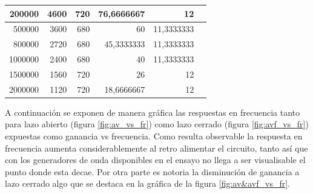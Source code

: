 \documentclass[12pt, letterpaper]{article}
\begin{document}
\begin{table}[H]
\begin{tabular}{|r|r|r|r|r|r}
    \cmidrule   200000 & 4600  & 720   & 76,6666667 & 12    &  \\
    
    \cmidrule   500000 & 3600  & 680   & 60    & 11,3333333 &  \\
    
    \cmidrule    800000 & 2720  & 680   & 45,3333333 & 11,3333333 &  \\
    
    \cmidrule    1000000 & 2400  & 680   & 40    & 11,3333333 &  \\
    \cmidrule   1500000 & 1560  & 720   & 26    & 12    &  \\
    \cmidrule    2000000 & 1120  & 720   & 18,6666667 & 12    &  \\
    \cmidrule    
    \end{tabular}
    \label{tab:tab_resp_frec}
\end{table}
\singlespacing
A continuación se exponen de manera gráfica las respuestas en frecuencia tanto para lazo abierto (figura \ref{fig:av_vs_fr}) como lazo cerrado (figura \ref{fig:avf_vs_fr}) expuestas como ganancia vs frecuencia.  Como resulta observable la respuesta en frecuencia aumenta considerablemente al retro alimentar el circuito, tanto así que con los generadores de onda disponibles en el ensayo no llega a ser visualisable el punto donde esta decae. Por otra parte es notoria la disminución de ganancia a lazo cerrado algo que se destaca en la gráfica de la figura \ref{fig:av&avf_vs_fr}.
\end{document}
